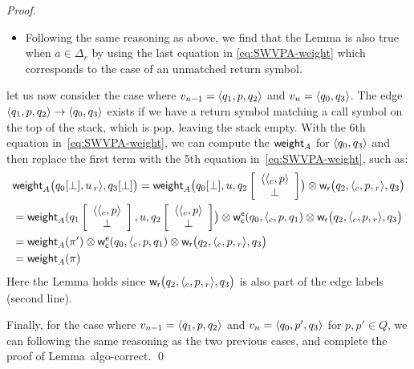 \begin{proof}
\begin{itemize}
\item Following the same reasoning as above, we find that the Lemma is also true when $a \in \Delta_r$ by using the last equation in \eqref{eq:SWVPA-weight} which corresponds to the case of an unmatched return symbol.
%
\end{itemize}
\noindent
let us now consider the case where $v_{n-1} = \< q_1, p, q_2>$ and $v_{n} = \< q_0, q_3>$. 
The edge $\< q_1, p, q_2> \to \< q_0, q_3>$ exists if we have a return symbol 
matching a call symbol on the top of the stack, 
which is pop, leaving the stack empty. 
With the 6th equation in~\eqref{eq:SWVPA-weight}, 
we can compute the $\mathsf{weight}_A$ for $\<q_0, q_3>$ 
and then replace the first term with the 5th equation in~\eqref{eq:SWVPA-weight}, such as:
\begin{align*}
&\weight_A\bigl(\config{q_0}{\bot}, u\,{\return{r}},
               \config{q_3}{\bot}\bigr) =
  \weight_A\bigl(\config{q_0}{\bot}, u,
                 \configup{q_2}{\<{\call{c}}, p>\stackup\bot}\bigr)
  \otimes \weir\bigl(q_2, {\call{c}}, p, {\return{r}}, q_3\bigr)\\
  &=
   \weight_A(\configup{q_1}{\<{\call{c}}, p>\stackup\bot}, u, \configup{q_2}{\<{\call{c}}, p>\stackup\bot}\bigr)
 \otimes \weiec(q_0, {\call{c}}, p, q_1)
  \otimes \weir\bigl(q_2, {\call{c}}, p, {\return{r}}, q_3\bigr)\\
  &= \weight_A(\pi')\otimes \weiec(q_0, {\call{c}}, p, q_1)
  \otimes \weir\bigl(q_2, {\call{c}}, p, {\return{r}}, q_3\bigr)\\
  &= \weight_A(\pi)
\end{align*}
%
Here the Lemma holds since ${\mathsf{w}_\mathsf{r}}\bigl(q_2, {\langle_{c}}, p, {_{r}{\rangle}}, q_3\bigr)$ 
is also part of the edge labels (second line).

Finally, for the case where $v_{n-1} = \<q_1, p, q_2>$ and $v_n = \<q_0, p', q_3>$ for $p, p' \in Q$, 
we can following the same reasoning as the two previous cases, and complete the proof of Lemma~{algo-correct}.
\qed
\end{proof}



